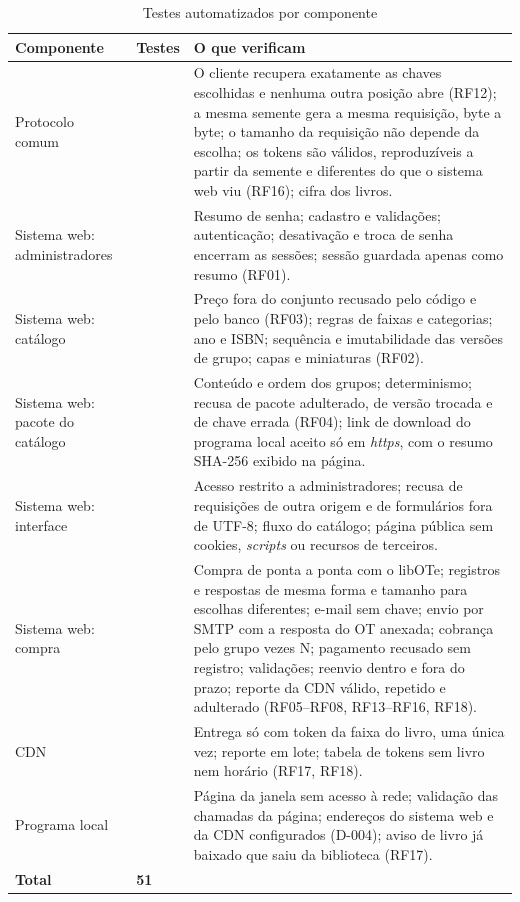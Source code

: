 \begin{table}[H]
\centering
\caption{Testes automatizados por componente}\label{tab:testes-auto}
\footnotesize
\renewcommand{\arraystretch}{1.2}
\begin{tabularx}{\textwidth}{@{}>{\raggedright\arraybackslash}p{}
  >{\raggedright\arraybackslash}p{} >{\raggedright\arraybackslash}X@{}}
\toprule
\textbf{Componente} & \textbf{Testes} & \textbf{O que verificam} \\
\midrule
Protocolo comum & 6 &
O cliente recupera exatamente as chaves escolhidas e nenhuma outra posição abre
(RF12); a mesma semente gera a mesma requisição, byte a byte; o tamanho da
requisição não depende da escolha; os tokens são válidos, reproduzíveis a
partir da semente e diferentes do que o sistema web viu (RF16); cifra dos
livros. \\
\addlinespace
Sistema web: administradores & 9 &
Resumo de senha; cadastro e validações; autenticação; desativação e troca de
senha encerram as sessões; sessão guardada apenas como resumo (RF01). \\
\addlinespace
Sistema web: catálogo & 9 &
Preço fora do conjunto recusado pelo código e pelo banco (RF03); regras de
faixas e categorias; ano e ISBN; sequência e imutabilidade das versões de
grupo; capas e miniaturas (RF02). \\
\addlinespace
Sistema web: pacote do catálogo & 5 &
Conteúdo e ordem dos grupos; determinismo; recusa de pacote adulterado, de
versão trocada e de chave errada (RF04); link de download do programa local
aceito só em \emph{https}, com o resumo SHA-256 exibido na página. \\
\addlinespace
Sistema web: interface & 9 &
Acesso restrito a administradores; recusa de requisições de outra origem e de
formulários fora de UTF-8; fluxo do catálogo; página pública sem cookies,
\emph{scripts} ou recursos de terceiros. \\
\addlinespace
Sistema web: compra & 8 &
Compra de ponta a ponta com o libOTe; registros e respostas de mesma forma e
tamanho para escolhas diferentes; e-mail sem chave; envio por SMTP com a
resposta do OT anexada; cobrança pelo grupo vezes N; pagamento recusado sem
registro; validações; reenvio dentro e fora do prazo; reporte da CDN válido,
repetido e adulterado (RF05--RF08, RF13--RF16, RF18). \\
\addlinespace
CDN & 1 &
Entrega só com token da faixa do livro, uma única vez; reporte em lote; tabela
de tokens sem livro nem horário (RF17, RF18). \\
\addlinespace
Programa local & 4 &
Página da janela sem acesso à rede; validação das chamadas da página;
endereços do sistema web e da CDN configurados (D-004); aviso de livro já
baixado que saiu da biblioteca (RF17). \\
\midrule
\textbf{Total} & \textbf{51} & \\
\bottomrule
\end{tabularx}
\end{table}

